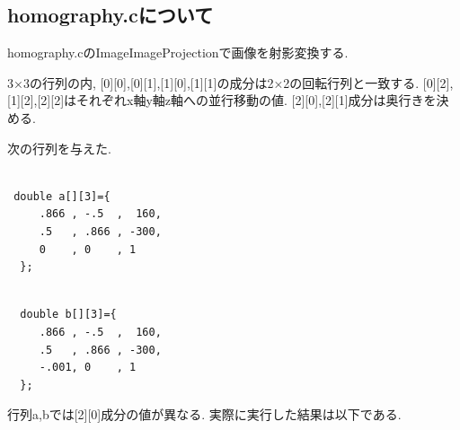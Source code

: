 \documentclass[a4j]{jarticle}
\begin{document}
\subsection{homography.cについて}
homography.cのImageImageProjectionで画像を射影変換する.

3×3の行列の内, [0][0],[0][1],[1][0],[1][1]の成分は2×2の回転行列と一致する. 
[0][2],[1][2],[2][2]はそれぞれx軸y軸z軸への並行移動の値. 
[2][0],[2][1]成分は奥行きを決める.

次の行列を与えた. 

\begin{minipage}{0.5\hsize}
\begin{verbatim}

 double a[][3]={
     .866 , -.5  ,  160,
     .5   , .866 , -300,
     0    , 0    , 1
  };

\end{verbatim}
\end{minipage}

\begin{minipage}{0.5\hsize}
\begin{verbatim}

  double b[][3]={
     .866 , -.5  ,  160,
     .5   , .866 , -300,
     -.001, 0    , 1
  };

\end{verbatim}
\end{minipage}

行列a,bでは[2][0]成分の値が異なる. 実際に実行した結果は以下である. 
\end{document}
